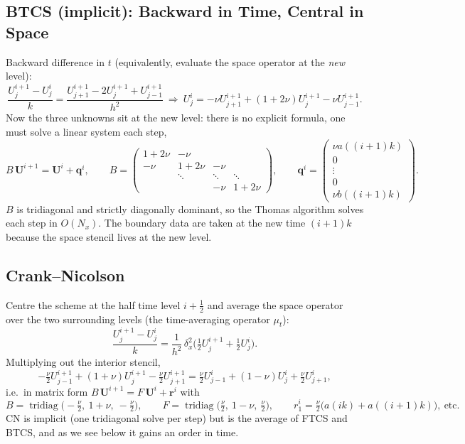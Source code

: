 \documentclass[11pt]{article}
\begin{document}
\subsection{BTCS (implicit): Backward in Time, Central in Space}
Backward difference in $t$ (equivalently, evaluate the space operator at the \emph{new} level):
\begin{equation}
\frac{U^{i+1}_j-U^i_j}{k} = \frac{U^{i+1}_{j+1}-2U^{i+1}_j+U^{i+1}_{j-1}}{h^2}
\ \Longrightarrow\
U^i_j = -\nu U^{i+1}_{j+1} + (1+2\nu)U^{i+1}_j - \nu U^{i+1}_{j-1}.
\label{eq:btcs}
\end{equation}
Now the three unknowns sit at the new level: there is no explicit formula, one must solve a linear system each step,
\begin{equation}
B\,\mathbf U^{i+1} = \mathbf U^i + \mathbf q^i,\qquad
B = \begin{pmatrix}
1+2\nu & -\nu & & \\
-\nu & 1+2\nu & -\nu & \\
 & \ddots & \ddots & \ddots \\
 & & -\nu & 1+2\nu
\end{pmatrix},\qquad
\mathbf q^i=\begin{pmatrix}\nu a((i{+}1)k)\\ 0\\ \vdots\\ 0\\ \nu b((i{+}1)k)\end{pmatrix}.
\label{eq:btcsmat}
\end{equation}
$B$ is tridiagonal and strictly diagonally dominant, so the Thomas algorithm solves each step in $O(N_x)$. The boundary data are taken at the new time $(i{+}1)k$ because the space stencil lives at the new level.

\subsection{Crank--Nicolson}
Centre the scheme at the half time level $i+\tfrac12$ and average the space operator over the two surrounding levels (the time-averaging operator $\mu_t$):
\begin{equation}
\frac{U^{i+1}_j-U^i_j}{k} = \frac{1}{h^2}\,\delta_x^2\Big(\tfrac12 U^{i+1}_j + \tfrac12 U^i_j\Big).
\label{eq:cn}
\end{equation}
Multiplying out the interior stencil,
\begin{equation}
-\tfrac{\nu}{2}U^{i+1}_{j-1} + (1+\nu)U^{i+1}_j - \tfrac{\nu}{2}U^{i+1}_{j+1}
= \tfrac{\nu}{2}U^{i}_{j-1} + (1-\nu)U^{i}_j + \tfrac{\nu}{2}U^{i}_{j+1},
\label{eq:cnstencil}
\end{equation}
i.e.\ in matrix form $B\,\mathbf U^{i+1}=F\,\mathbf U^i+\mathbf r^i$ with
\[
B = \operatorname{tridiag}\!\big(-\tfrac\nu2,\ 1+\nu,\ -\tfrac\nu2\big),\qquad
F = \operatorname{tridiag}\!\big(\tfrac\nu2,\ 1-\nu,\ \tfrac\nu2\big),\qquad
r^i_1 = \tfrac\nu2\big(a(ik)+a((i{+}1)k)\big),\ \text{etc.}
\]
CN is implicit (one tridiagonal solve per step) but is the average of FTCS and BTCS, and as we see below it gains an order in time.
\end{document}
